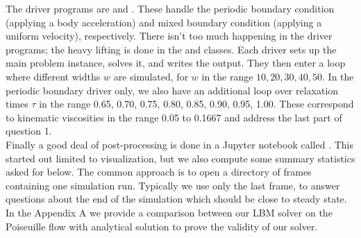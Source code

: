 The driver programs are  and .  
These handle the periodic boundary condition (applying a body acceleration) and mixed boundary condition (applying a uniform velocity), respectively.
There isn't too much happening in the driver programs; 
the heavy lifting is done in the  and  classes.
Each driver sets up the main problem instance, solves it, and writes the output.
They then enter a loop where different widths $w$ are simulated, 
for $w$ in the range $10, 20, 30, 40, 50$.
In the periodic boundary driver  only, 
we also have an additional loop over relaxation times $\tau$ 
in the range 0.65, 0.70, 0.75, 0.80, 0.85, 0.90, 0.95, 1.00.
These correspond to kinematic viscosities in the range 0.05 to 0.1667
and address the last part of question 1. \\

Finally a good deal of post-processing is done in a Jupyter notebook called .
This started out limited to visualization, but we also compute 
some summary statistics asked for below.  
The common approach is to open a directory of frames containing one simulation run.
Typically we use only the last frame, to answer questions about the end of the 
simulation which should be close to steady state. \\

In the Appendix A we provide a comparison between our LBM solver on the Poiseuille flow with analytical solution to prove the validity of our solver.